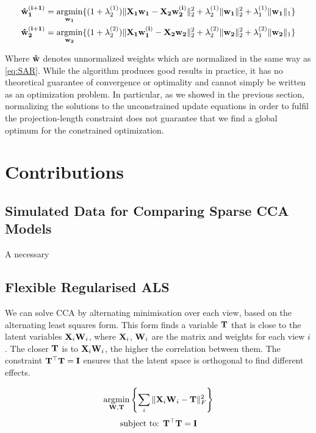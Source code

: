 \begin{align}
    & \bold{\hat{w}^{(i+1)}_1}=\underset{\bold{w_1}}{\mathrm{argmin}}\{(1+\lambda^{(1)}_2)\|\bold{X_1w_1-X_2w^{(i)}_2}\|^2_2 + \lambda^{(1)}_2\|\bold{w_1}\|^2_2 + \lambda^{(1)}_1\|\bold{w_1}\|_1 \}\\
    & \bold{\hat{w}^{(i+1)}_2}=\underset{\bold{w_2}}{\mathrm{argmin}}\{(1+\lambda^{(2)}_2)\|\bold{X_1w_1^{(i)}-X_2w_2}\|^2_2 + \lambda^{(2)}_2\|\bold{w_2}\|^2_2 + \lambda^{(2)}_1\|\bold{w_2}\|_1 \}
\end{align}

Where $\bold{\hat{w}}$ denotes unnormalized weights which are normalized in the same way as \ref{eq:SAR}. While the algorithm produces good results in practice, it has no theoretical guarantee of convergence or optimality and cannot simply be written as an optimization problem. In particular, as we showed in the previous section, normalizing the solutions to the unconstrained update equations in order to fulfil the projection-length constraint does not guarantee that we find a global optimum for the constrained optimization. 


\section{Contributions}

\subsection{Simulated Data for Comparing Sparse CCA Models}

A necessary 

\subsection{Flexible Regularised ALS}

We can solve CCA by alternating minimisation over each view, based on the alternating least squares form. This form finds a variable $\bold{T}$ that is close to the latent variables $\bold{X}_i\bold{W}_i$, where $\bold{X}_i$, $\bold{W}_i$ are the matrix and weights for each view $i$. The closer $\bold{T}$ is to $\bold{X}_i\bold{W}_i$, the higher the correlation between them. The constraint  $\bold{T^{\top}T}=\bold{I}$ ensures that the latent space is orthogonal to find different effects.

\[ \underset{\bold{W},\bold{T}}{\mathrm{argmin}}\left\{\sum_i \|\bold{X}_i\bold{W}_i-\bold{T}\|_{F}^2 \right\} \]
  \[ \text{subject to: } \bold{T^{\top}T}=\bold{I} \]

